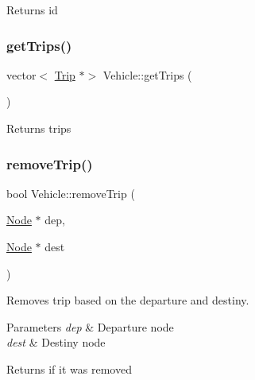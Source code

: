 \begin{DoxyReturn}{Returns}
id 
\end{DoxyReturn}
\mbox{\label{class_vehicle_a8c13aa94ebf49bbe64764b53a889a840}} 
\subsubsection{\texorpdfstring{get\+Trips()}{getTrips()}}
{\footnotesize\ttfamily vector$<$ \mbox{\hyperlink{class_trip}{Trip}} $\ast$$>$ Vehicle\+::get\+Trips (\begin{DoxyParamCaption}{ }\end{DoxyParamCaption})}

\begin{DoxyReturn}{Returns}
trips 
\end{DoxyReturn}
\mbox{\label{class_vehicle_a5a5e5b45575b6000ffca90c7da4fcb44}} 
\subsubsection{\texorpdfstring{remove\+Trip()}{removeTrip()}}
{\footnotesize\ttfamily bool Vehicle\+::remove\+Trip (\begin{DoxyParamCaption}\item[{\mbox{\hyperlink{class_node}{Node}} $\ast$}]{dep,  }\item[{\mbox{\hyperlink{class_node}{Node}} $\ast$}]{dest }\end{DoxyParamCaption})}



Removes trip based on the departure and destiny. 


\begin{DoxyParams}{Parameters}
{\em dep} & Departure node \\
\hline
{\em dest} & Destiny node \\
\hline
\end{DoxyParams}
\begin{DoxyReturn}{Returns}
if it was removed 
\end{DoxyReturn}
\mbox{\label{class_vehicle_acceb523a48842847e13b22ef71798907}} 
